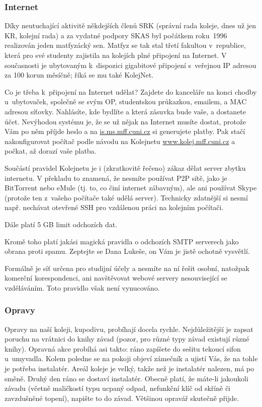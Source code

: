 \subsubsection{Internet}

Díky neutuchající aktivitě někdejších členů SRK (správní rada
koleje, dnes už jen KR, kolejní rada) a za vydatné podpory SKAS
byl počátkem roku~1996 realizován jeden matfyzácký sen. Matfyz se
tak stal třetí fakultou v~republice, která pro své studenty
zajistila na kolejích plné připojení na Internet. V současnosti je ubytovaným k~dispozici gigabitové připojení s~veřejnou IP adresou za 100 korun měsíčně; říká se mu také KolejNet.

Co je třeba k~připojení na Internet udělat?
Zajdete do kanceláře na konci chodby u~ubytovaček, společně se svým OP, studentskou průkazkou, emailem, a MAC adresou síťovky. Nahlásíte, kde bydlíte a která zásuvka bude vaše, a dostanete účet. 
Nevýhodou systému je,
že se už nějak na Internet musíte dostat, protože Vám po něm
příjde heslo a na \url{is.ms.mff.cuni.cz} si generujete
platby. Pak stačí nakonfigurovat počítač podle návodu na Kolejnetu
\url{www.kolej.mff.cuni.cz} a počkat, až dorazí vaše
platba.


Součástí pravidel Kolejnetu je i (zkratkovitě řečeno) zákaz dělat server zbytku internetu. V překladu to znamená, že nesmíte používat P2P sítě, jako je BitTorrent nebo eMule (tj. to, co činí internet zábavným), ale ani používat Skype (protože ten z~vašeho počítače také udělá server). Technicky zdatnější si nesmí např. nechávat otevřené SSH pro vzdálenou práci na kolejním počítači.

Dále platí 5 GB limit odchozích dat.

Kromě toho platí jakási magická pravidla o odchozích SMTP serverech jako obrana proti spamu. Zeptejte se Dana Lukeše, on Vám je jistě ochotně vysvětlí.

Formálně je síť určena pro studijní účely a nesmíte na ní řešit osobní, natožpak komerční korespondenci, ani navštěvovat webové servery nesouvisející se vzdě\-lá\-vá\-ním. Toto pravidlo však není vynucováno.


\subsubsection{Opravy}

Opravy na naší koleji, kupodivu, probíhají docela rychle. Nejdůležitější
je zapsat poruchu na vrátnici do knihy závad (pozor, pro různé typy závad
existují různé knihy). Opravná akce probíhá asi takto: ráno zapíšete
do sešitu tekoucí sifon u~umyvadla. Kolem poledne se na pokoji objeví
zámečník a ujistí Vás, že na tohle je potřeba instalatér. Areál koleje je
velký, takže než je instalatér nalezen, má po směně. Druhý den ráno se
dostaví instalatér.  Obecně platí, že máte-li jakoukoli závadu (včetně
maličkostí typu ucpaný odpad, nefunkční klíč od skříně či zavzdušněné
topení), napište to do závad. Většinou opravář skutečně přijde.


